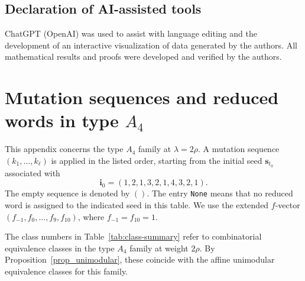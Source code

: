\documentclass[10pt]{amsart}
\numberwithin{equation}{section}
\theoremstyle{plain}
\theoremstyle{definition}
\theoremstyle{remark}
\begin{document}
\subsection*{Declaration of AI-assisted tools} 
ChatGPT (OpenAI) was used to assist with language editing and the development of an interactive visualization of data generated by the authors. All mathematical results and proofs were developed and verified by the authors. 

\appendix
\section{Mutation sequences and reduced words in type $A_4$}
\label{sec_appendix}

This appendix concerns the type $A_4$ family at
$\lambda=2\rho$.
A mutation sequence $(k_1,\ldots,k_\ell)$ is applied
in the listed order, starting from the initial seed
$\bm s_{t_0}$ associated with
\[
\bm i_0=(1,2,1,3,2,1,4,3,2,1).
\]
The empty sequence is denoted by $()$.
The entry \texttt{None} means that no reduced word is assigned to
the indicated seed in this table. 
We use the extended $f$-vector
$(f_{-1},f_0,\ldots,f_9,f_{10})$,
where $f_{-1}=f_{10}=1$.

The class numbers in Table~\ref{tab:class-summary}
refer to combinatorial equivalence classes in the
type $A_4$ family at weight $2\rho$.
By Proposition~\ref{prop_unimodular}, these coincide
with the affine unimodular equivalence classes
for this family.
\end{document}
